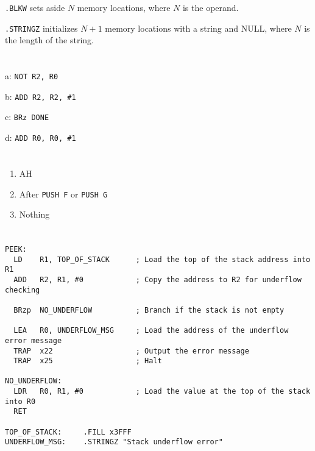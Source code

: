 \documentclass[UTF8]{ctexart}
\begin{document}
\lstinline{.BLKW} sets aside $N$ memory locations, where $N$ is the operand.

\lstinline{.STRINGZ} initializes $N+1$ memory locations with a string and NULL, where $N$ is the length of the string.
\section{}  %
a: \lstinline{NOT R2, R0}

b: \lstinline{ADD R2, R2, #1}

c: \lstinline{BRz DONE}

d: \lstinline{ADD R0, R0, #1}
\section{}  %

\section{}  %
\begin{enumerate}
  \item AH
  \item After \lstinline{PUSH F} or \lstinline{PUSH G}
  \item Nothing
\end{enumerate}

\section{}  %
\begin{lstlisting}
PEEK:
  LD    R1, TOP_OF_STACK      ; Load the top of the stack address into R1
  ADD   R2, R1, #0            ; Copy the address to R2 for underflow checking
  
  BRzp  NO_UNDERFLOW          ; Branch if the stack is not empty
  
  LEA   R0, UNDERFLOW_MSG     ; Load the address of the underflow error message
  TRAP  x22                   ; Output the error message
  TRAP  x25                   ; Halt
  
NO_UNDERFLOW:
  LDR   R0, R1, #0            ; Load the value at the top of the stack into R0
  RET

TOP_OF_STACK:     .FILL x3FFF
UNDERFLOW_MSG:    .STRINGZ "Stack underflow error"
\end{lstlisting}
\end{document}
